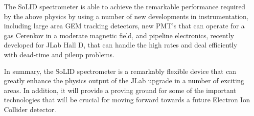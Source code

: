 \documentclass[12pt]{article}
\begin{document}
The SoLID spectrometer is able to achieve the remarkable performance 
required by the above physics by using a number of new developments in 
instrumentation, including large area GEM tracking detectors, new PMT's 
that can operate for a gas Cerenkov in a moderate magnetic field, and 
pipeline electronics, recently developed for JLab Hall D, that can handle the 
high rates and deal efficiently with dead-time and pileup problems.

 \newpage
In summary, the SoLID spectrometer is a remarkably flexible device that 
can greatly enhance the physics output of the JLab upgrade in a number 
of exciting areas.  In addition, it will provide a proving ground for 
some of the important technologies that will be crucial for moving 
forward towards a future Electron Ion Collider detector.

 \newpage

\newpage
\end{document}
